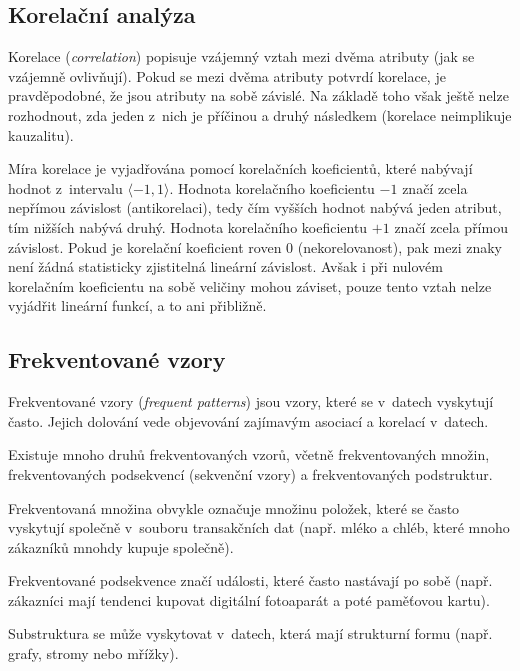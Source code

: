 \subsection{Korelační analýza}

\begin{compactitem}
    \item Korelace (\textit{correlation}) popisuje vzájemný vztah mezi dvěma atributy (jak se vzájemně ovlivňují). Pokud se mezi dvěma atributy potvrdí korelace, je pravděpodobné, že jsou atributy na sobě závislé. Na základě toho však ještě nelze rozhodnout, zda jeden z~nich je příčinou a druhý následkem (korelace neimplikuje kauzalitu).

    \item Míra korelace je vyjadřována pomocí korelačních koeficientů, které nabývají hodnot z~intervalu $\langle-1,1\rangle$. Hodnota korelačního koeficientu $-1$ značí zcela nepřímou závislost (antikorelaci), tedy čím vyšších hodnot nabývá jeden atribut, tím nižších nabývá druhý. Hodnota korelačního koeficientu $+1$ značí zcela přímou závislost. Pokud je korelační koeficient roven 0 (nekorelovanost), pak mezi znaky není žádná statisticky zjistitelná lineární závislost. Avšak i při nulovém korelačním koeficientu na sobě veličiny mohou záviset, pouze tento vztah nelze vyjádřit lineární funkcí, a to ani přibližně.
\end{compactitem}

\subsection{Frekventované vzory}

\begin{compactitem}
    \item Frekventované vzory (\textit{frequent patterns}) jsou vzory, které se v~datech vyskytují často. Jejich dolování vede objevování zajímavým asociací a korelací v~datech.

    \item Existuje mnoho druhů frekventovaných vzorů, včetně frekventovaných množin, frekventovaných podsekvencí (sekvenční vzory) a frekventovaných podstruktur.

    \item Frekventovaná množina obvykle označuje množinu položek, které se často vyskytují společně v~souboru transakčních dat (např. mléko a chléb, které mnoho zákazníků mnohdy kupuje společně).

    \item Frekventované podsekvence značí události, které často nastávají po sobě (např. zákazníci mají tendenci kupovat digitální fotoaparát a poté paměťovou kartu).

    \item Substruktura se může vyskytovat v~datech, která mají strukturní formu (např. grafy, stromy nebo mřížky).
\end{compactitem}





